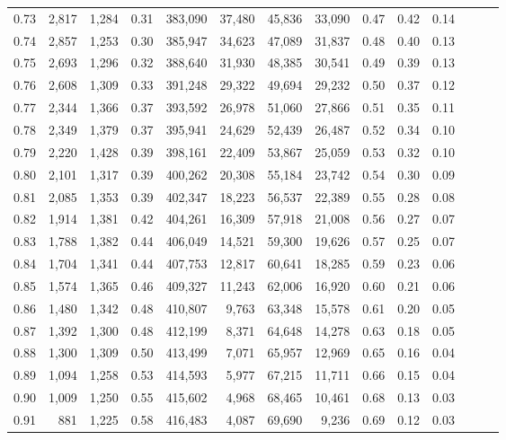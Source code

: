 \begin{tabular}{rrrrrrrrrrrrrr}
0.73 &  2,817 &  1,284 &  0.31 &  383,090 &   37,480 &  45,836 &  33,090 &  0.47 &  0.42 &      0.14 \\
0.74 &  2,857 &  1,253 &  0.30 &  385,947 &   34,623 &  47,089 &  31,837 &  0.48 &  0.40 &      0.13 \\
0.75 &  2,693 &  1,296 &  0.32 &  388,640 &   31,930 &  48,385 &  30,541 &  0.49 &  0.39 &      0.13 \\
0.76 &  2,608 &  1,309 &  0.33 &  391,248 &   29,322 &  49,694 &  29,232 &  0.50 &  0.37 &      0.12 \\
0.77 &  2,344 &  1,366 &  0.37 &  393,592 &   26,978 &  51,060 &  27,866 &  0.51 &  0.35 &      0.11 \\
0.78 &  2,349 &  1,379 &  0.37 &  395,941 &   24,629 &  52,439 &  26,487 &  0.52 &  0.34 &      0.10 \\
0.79 &  2,220 &  1,428 &  0.39 &  398,161 &   22,409 &  53,867 &  25,059 &  0.53 &  0.32 &      0.10 \\
0.80 &  2,101 &  1,317 &  0.39 &  400,262 &   20,308 &  55,184 &  23,742 &  0.54 &  0.30 &      0.09 \\
0.81 &  2,085 &  1,353 &  0.39 &  402,347 &   18,223 &  56,537 &  22,389 &  0.55 &  0.28 &      0.08 \\
0.82 &  1,914 &  1,381 &  0.42 &  404,261 &   16,309 &  57,918 &  21,008 &  0.56 &  0.27 &      0.07 \\
0.83 &  1,788 &  1,382 &  0.44 &  406,049 &   14,521 &  59,300 &  19,626 &  0.57 &  0.25 &      0.07 \\
0.84 &  1,704 &  1,341 &  0.44 &  407,753 &   12,817 &  60,641 &  18,285 &  0.59 &  0.23 &      0.06 \\
0.85 &  1,574 &  1,365 &  0.46 &  409,327 &   11,243 &  62,006 &  16,920 &  0.60 &  0.21 &      0.06 \\
0.86 &  1,480 &  1,342 &  0.48 &  410,807 &    9,763 &  63,348 &  15,578 &  0.61 &  0.20 &      0.05 \\
0.87 &  1,392 &  1,300 &  0.48 &  412,199 &    8,371 &  64,648 &  14,278 &  0.63 &  0.18 &      0.05 \\
0.88 &  1,300 &  1,309 &  0.50 &  413,499 &    7,071 &  65,957 &  12,969 &  0.65 &  0.16 &      0.04 \\
0.89 &  1,094 &  1,258 &  0.53 &  414,593 &    5,977 &  67,215 &  11,711 &  0.66 &  0.15 &      0.04 \\
0.90 &  1,009 &  1,250 &  0.55 &  415,602 &    4,968 &  68,465 &  10,461 &  0.68 &  0.13 &      0.03 \\
0.91 &    881 &  1,225 &  0.58 &  416,483 &    4,087 &  69,690 &   9,236 &  0.69 &  0.12 &      0.03 \\

\end{tabular}

